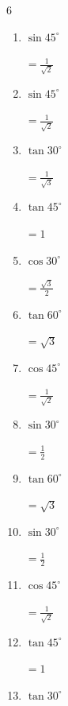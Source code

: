 \begin{multicols}{6}
\begin{enumerate}
        $\displaystyle =\frac{\sqrt{3}}{2}$

  \item $\displaystyle \sin{45^\circ}$

        $\displaystyle =\frac{1}{\sqrt{2}}$

  \item $\displaystyle \sin{45^\circ}$

        $\displaystyle =\frac{1}{\sqrt{2}}$

  \item $\displaystyle \tan{30^\circ}$

        $\displaystyle =\frac{1}{\sqrt{3}}$

  \item $\displaystyle \tan{45^\circ}$

        $\displaystyle =1$

  \item $\displaystyle \cos{30^\circ}$

        $\displaystyle =\frac{\sqrt{3}}{2}$

  \item $\displaystyle \tan{60^\circ}$

        $\displaystyle =\sqrt{3}$

  \item $\displaystyle \cos{45^\circ}$

        $\displaystyle =\frac{1}{\sqrt{2}}$

  \item $\displaystyle \sin{30^\circ}$

        $\displaystyle =\frac{1}{2}$

  \item $\displaystyle \tan{60^\circ}$

        $\displaystyle =\sqrt{3}$

  \item $\displaystyle \sin{30^\circ}$

        $\displaystyle =\frac{1}{2}$

  \item $\displaystyle \cos{45^\circ}$

        $\displaystyle =\frac{1}{\sqrt{2}}$

  \item $\displaystyle \tan{45^\circ}$

        $\displaystyle =1$

\columnbreak %

  \item $\displaystyle \tan{30^\circ}$


\end{enumerate}
\end{multicols}

